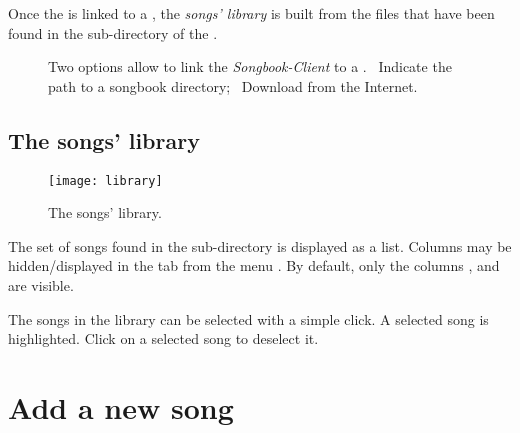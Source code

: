 Once the \client{} is linked to a \recueil{}, the \emph{songs'
  library} is built from the  files that have been found in
the  sub-directory of the \recueil{}.


\begin{figure}
  \centering
  \hspace{0.1cm}%
  \caption{%
    Two options allow to link the \emph{Songbook-Client} to a \recueil{}.
    ~Indicate the path to a songbook directory;%
    ~Download from the Internet.%
  }%
  \label{fig:solutions}
\end{figure}


\subsection{The songs' library}

\begin{figure}
  \centering
  \texttt{[image: library]}
  \caption{The songs' library.}
  \label{fig:library}
\end{figure}

The set of  songs found in the  sub-directory
is displayed as a list. Columns may be hidden/displayed in the tab
 from the menu . By
default, only the columns ,  and
 are visible.

The songs in the library can be selected with a simple click.  A
selected song is highlighted. Click on a selected song to deselect it.

\section{Add a new song}

